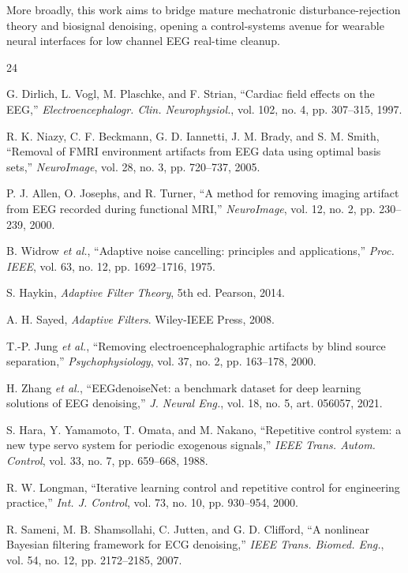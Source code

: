 \documentclass[conference]{IEEEtran}
\begin{document}
More broadly, this work aims to bridge mature mechatronic disturbance-rejection theory and 
biosignal denoising, opening a control-systems avenue for wearable neural interfaces for low channel EEG real-time cleanup.


\begin{thebibliography}{24}

 G. Dirlich, L. Vogl, M. Plaschke, and F. Strian, ``Cardiac field effects on 
the EEG,'' \emph{Electroencephalogr. Clin. Neurophysiol.}, vol. 102, no. 4, pp. 307--315, 1997.

 R. K. Niazy, C. F. Beckmann, G. D. Iannetti, J. M. Brady, and S. M. Smith, 
``Removal of FMRI environment artifacts from EEG data using optimal basis sets,'' 
\emph{NeuroImage}, vol. 28, no. 3, pp. 720--737, 2005.

 P. J. Allen, O. Josephs, and R. Turner, ``A method for removing imaging artifact
from EEG recorded during functional MRI,'' \emph{NeuroImage}, vol. 12, no. 2, pp. 230--239, 2000.

 B. Widrow \emph{et al.}, ``Adaptive noise cancelling: principles and 
applications,'' \emph{Proc. IEEE}, vol. 63, no. 12, pp. 1692--1716, 1975.

 S. Haykin, \emph{Adaptive Filter Theory}, 5th ed. Pearson, 2014.

 A. H. Sayed, \emph{Adaptive Filters}. Wiley-IEEE Press, 2008.

 T.-P. Jung \emph{et al.}, ``Removing electroencephalographic artifacts by blind 
source separation,'' \emph{Psychophysiology}, vol. 37, no. 2, pp. 163--178, 2000.

 H. Zhang \emph{et al.}, ``EEGdenoiseNet: a benchmark dataset for deep learning 
solutions of EEG denoising,'' \emph{J. Neural Eng.}, vol. 18, no. 5, art. 056057, 2021.

 S. Hara, Y. Yamamoto, T. Omata, and M. Nakano, ``Repetitive control system: a 
new type servo system for periodic exogenous signals,'' \emph{IEEE Trans. Autom. Control}, vol. 33, 
no. 7, pp. 659--668, 1988.

 R. W. Longman, ``Iterative learning control and repetitive control for 
engineering practice,'' \emph{Int. J. Control}, vol. 73, no. 10, pp. 930--954, 2000.

 R. Sameni, M. B. Shamsollahi, C. Jutten, and G. D. Clifford, ``A nonlinear 
Bayesian filtering framework for ECG denoising,'' \emph{IEEE Trans. Biomed. Eng.}, vol. 54, no. 12, 
pp. 2172--2185, 2007.


\end{thebibliography}
\end{document}
